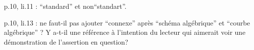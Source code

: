 p.10, li.11 : ``standard'' et non``standart''.

p.10, li.13 : ne faut-il pas ajouter ``connexe'' après ``schéma algébrique'' et ``courbe algébrique'' ? Y a-t-il une référence à l'intention du lecteur qui aimerait voir une démonstration de l'assertion en question?

\clearpage

